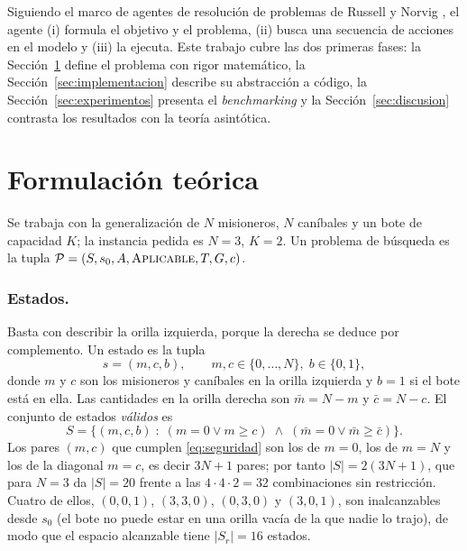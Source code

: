 \documentclass[runningheads]{llncs}
\newcommand{\Sr}{S_{r}}
\newcommand{\st}[3]{(#1,#2,#3)}
\begin{document}
Siguiendo el marco de agentes de resolución de problemas de Russell y Norvig
\cite{russell2020}, el agente (i) formula el objetivo y el problema, (ii) busca
una secuencia de acciones en el modelo y (iii) la ejecuta. Este trabajo cubre las
dos primeras fases: la Sección~\ref{sec:formulacion} define el problema con
rigor matemático, la Sección~\ref{sec:implementacion} describe su abstracción a
código, la Sección~\ref{sec:experimentos} presenta el \emph{benchmarking} y la
Sección~\ref{sec:discusion} contrasta los resultados con la teoría asintótica.

\section{Formulación teórica}\label{sec:formulacion}

Se trabaja con la generalización de $N$ misioneros, $N$ caníbales y un bote de
capacidad $K$; la instancia pedida es $N=3$, $K=2$. Un problema de búsqueda es la
tupla $\mathcal{P} = (S, s_0, A, \textsc{Aplicable}, T, G, c)$.

\subsubsection{Estados.}
Basta con describir la orilla izquierda, porque la derecha se deduce por
complemento. Un estado es la tupla
\begin{equation}
  s = (m, c, b), \qquad m, c \in \{0,\dots,N\},\; b\in\{0,1\},
\end{equation}
donde $m$ y $c$ son los misioneros y caníbales en la orilla izquierda y $b=1$
si el bote está en ella. Las cantidades en la orilla derecha son
$\bar m = N-m$ y $\bar c = N-c$. El conjunto de estados \emph{válidos} es
\begin{equation}
  S = \bigl\{ (m,c,b) \;:\; (m = 0 \lor m \ge c) \;\land\; (\bar m = 0 \lor \bar m \ge \bar c) \bigr\}.
  \label{eq:seguridad}
\end{equation}
Los pares $(m,c)$ que cumplen \eqref{eq:seguridad} son los de $m=0$, los de
$m=N$ y los de la diagonal $m=c$, es decir $3N+1$ pares; por tanto
$|S| = 2(3N+1)$, que para $N=3$ da $|S|=20$ frente a las $4\cdot 4\cdot 2=32$
combinaciones sin restricción. Cuatro de ellos,
$\st{0}{0}{1}$, $\st{3}{3}{0}$, $\st{0}{3}{0}$ y $\st{3}{0}{1}$, son
inalcanzables desde $s_0$ (el bote no puede estar en una orilla vacía de la que
nadie lo trajo), de modo que el espacio alcanzable tiene $|\Sr| = 16$ estados.
\end{document}
